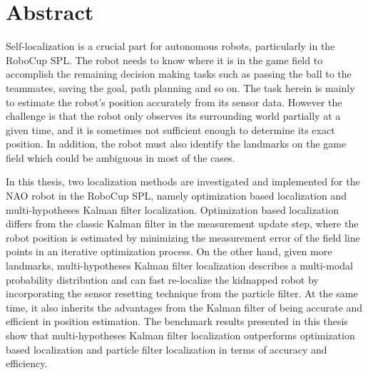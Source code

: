 \thispagestyle{empty}
\chapter*{Abstract}

Self-localization is a crucial part for autonomous robots, particularly in the RoboCup \gls{SPL}. The robot needs to know where it is in the game field to accomplish the remaining decision making tasks such as passing the ball to the teammates, saving the goal, path planning and so on. The task herein is mainly to estimate the robot's position accurately from its sensor data. However the challenge is that the robot only observes its surrounding world partially at a given time, and it is sometimes not sufficient enough to determine its exact position. In addition, the robot must also identify the landmarks on the game field which could be ambiguous in most of the cases. 

In this thesis, two localization methods are investigated and implemented for the NAO robot in the RoboCup \gls{SPL}, namely optimization based localization and multi-hypotheses Kalman filter localization.
Optimization based localization differs from the classic Kalman filter in the measurement update step, where the robot position is estimated by minimizing the measurement error of the field line points in an iterative optimization process. 
On the other hand, given more landmarks, multi-hypotheses Kalman filter localization describes a multi-modal probability distribution and can fast re-localize the kidnapped robot by incorporating the sensor resetting technique from the particle filter. At the same time, it also inherits the advantages from the Kalman filter of being accurate and efficient in position estimation. The benchmark results presented in this thesis show that multi-hypotheses Kalman filter localization outperforms optimization based localization and particle filter localization in terms of accuracy and efficiency.
